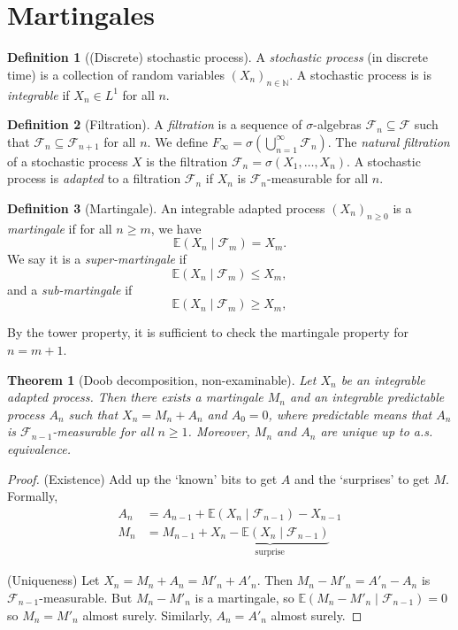 \documentclass[parskip=full]{article}
\newtheorem{theorem}{Theorem}[section]
\theoremstyle{definition}
\newtheorem*{definition}{Definition}
\newcommand{\1}{\mathbbm{1}}
\newcommand{\E}{\mathbb{E}}
\begin{document}
\section{Martingales}
\begin{definition}[(Discrete) stochastic process]
  A \emph{stochastic process} (in discrete time) is a collection of random variables $(X_n)_{n \in \mathbb{N}}$. A stochastic process is is \emph{integrable} if $X_n \in L^1$ for all $n$.
\end{definition}
\begin{definition}[Filtration]
  A \emph{filtration} is a sequence of $\sigma$-algebras $\mathcal{F}_n \subseteq \mathcal{F}$ such that $\mathcal{F}_n \subseteq \mathcal{F}_{n+1}$ for all $n$. We define $F_\infty = \sigma(\bigcup_{n=1}^\infty \mathcal{F}_n).$ The \emph{natural filtration} of a stochastic process $X$ is the filtration $\mathcal{F}_n = \sigma(X_1, \ldots, X_n)$. A stochastic process is \emph{adapted} to a filtration $\mathcal{F}_n$ if $X_n$ is $\mathcal{F}_n$-measurable for all $n$.
\end{definition}

\begin{definition}[Martingale]
  An integrable adapted process $(X_n)_{n \geq 0}$ is a \emph{martingale} if for all $n \geq m$, we have
  \[
    \E(X_n \mid \mathcal{F}_m) = X_m.
  \]
  We say it is a \emph{super-martingale} if
  \[
    \E(X_n \mid \mathcal{F}_m) \leq X_m,
  \]
  and a \emph{sub-martingale} if
  \[
    \E(X_n \mid \mathcal{F}_m) \geq X_m,
  \]
\end{definition}
By the tower property, it is sufficient to check the martingale property for $n = m+1$.

\begin{theorem}[Doob decomposition, non-examinable]
  Let $X_n$ be an integrable adapted process. Then there exists a martingale $M_n$ and an integrable predictable process $A_n$ such that $X_n = M_n + A_n$ and $A_0 = 0$, where predictable means that $A_n$ is $\mathcal{F}_{n-1}$-measurable for all $n \geq 1$. Moreover, $M_n$ and $A_n$ are unique up to a.s. equivalence.
\end{theorem}

\begin{proof}
  (Existence)
  Add up the `known' bits to get $A$ and the `surprises' to get $M$. Formally,
  \begin{align*}
    A_n & = A_{n-1} + \E(X_n \mid \mathcal{F}_{n-1}) - X_{n-1}                            \\
    M_n & = M_{n-1} + \underbrace{X_n - \E(X_n \mid \mathcal{F}_{n-1})}_{\text{surprise}}
  \end{align*}

  (Uniqueness) Let $X_n = M_n + A_n = M'_n + A'_n$. Then $M_n - M'_n = A'_n - A_n$ is $\mathcal{F}_{n-1}$-measurable. But $M_n - M'_n$ is a martingale, so $\E(M_n - M'_n \mid \mathcal{F}_{n-1}) = 0$ so $M_n = M'_n$ almost surely. Similarly, $A_n = A'_n$ almost surely.
\end{proof}
\end{document}
